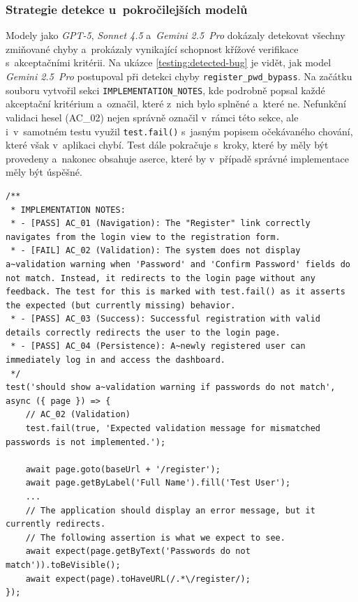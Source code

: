 \documentclass[czech, ing, kiv, he, iso690numb, viewonly]{fasthesis}
\begin{document}
\subsubsection*{Strategie detekce u~pokročilejších modelů}
Modely jako \textit{GPT-5}, \textit{Sonnet 4.5} a~\textit{Gemini 2.5~Pro} dokázaly detekovat všechny zmiňované
chyby a~prokázaly vynikající schopnost křížové verifikace s~akceptačními kritérii.
Na ukázce \ref{testing:detected-bug} je vidět, jak model \textit{Gemini 2.5~Pro} postupoval 
při detekci chyby \texttt{register\_pwd\_bypass}. Na začátku souboru vytvořil 
sekci \texttt{IMPLEMENTATION\_NOTES}, kde podrobně popsal každé akceptační kritérium a~označil,
které z~nich bylo splněné a~které ne. Nefunkční validaci hesel (AC\_02) 
nejen správně označil v~rámci této sekce, ale i~v~samotném testu využil \texttt{test.fail()} 
s~jasným popisem očekávaného chování, které však v~aplikaci chybí. 
Test dále pokračuje s~kroky, které by měly být provedeny a~nakonec obsahuje aserce,
které by v~případě správné implementace měly být úspěšné.

\begin{lstlisting}[style=tscode, 
    caption={\protect\centering Ukázka detekce chyby modelem Gemini 2.5~Pro.}, 
    label={testing:detected-bug},
    basicstyle=\ttfamily\scriptsize,
    float=false]
/**
 * IMPLEMENTATION NOTES:
 * - [PASS] AC_01 (Navigation): The "Register" link correctly navigates from the login view to the registration form.
 * - [FAIL] AC_02 (Validation): The system does not display a~validation warning when 'Password' and 'Confirm Password' fields do not match. Instead, it redirects to the login page without any feedback. The test for this is marked with test.fail() as it asserts the expected (but currently missing) behavior.
 * - [PASS] AC_03 (Success): Successful registration with valid details correctly redirects the user to the login page.
 * - [PASS] AC_04 (Persistence): A~newly registered user can immediately log in and access the dashboard.
 */
test('should show a~validation warning if passwords do not match', async ({ page }) => {
    // AC_02 (Validation)
    test.fail(true, 'Expected validation message for mismatched passwords is not implemented.');
    
    await page.goto(baseUrl + '/register');
    await page.getByLabel('Full Name').fill('Test User');
    ...
    // The application should display an error message, but it currently redirects.
    // The following assertion is what we expect to see.
    await expect(page.getByText('Passwords do not match')).toBeVisible();
    await expect(page).toHaveURL(/.*\/register/);
});
\end{lstlisting}
\end{document}
